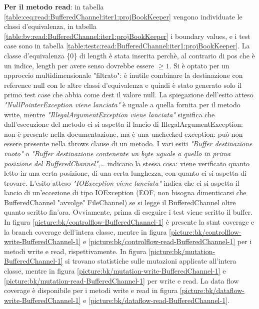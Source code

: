 \documentclass[10pt, a4paper]{article}
\newcommand{\gettablelabel}[5]{table:#1:#2:#3:iter#4:proj#5}
\newcommand{\getpicturelabel}[1]{picture:#1}
\def\bookkeeper{BookKeeper}
\newcommand{\ceq}[1]{\{#1\}}
\begin{document}
	\textbf{Per il metodo read}: in tabella \ref{\gettablelabel{ceq}{read}{BufferedChannel}{1}{\bookkeeper}}
	vengono individuate le classi d'equivalenza, in tabella 
	\ref{\gettablelabel{bv}{read}{BufferedChannel}{1}{\bookkeeper}} 
	i boundary values, e i test case sono in tabella 
	\ref{\gettablelabel{testc}{read}{BufferedChannel}{1}{\bookkeeper}}.
	La classe d'equivalenza \ceq{0} di length è stata inserita perchè, al contrario di pos che è un indice, 
	length per avere senso dovrebbe essere $\ge 1$.
	Si è optato per un approccio multidimensionale "filtrato": è inutile combinare la destinazione con reference
	null con le altre classi d'equivalenza e quindi è stato generato solo il primo test case che abbia come
	dest il valore null.
	La spiegazione dell'esito atteso \textit{"NullPointerException viene lanciata"} è uguale a quella fornita
	per il metodo write, mentre \textit{"IllegalArgumentException viene lanciata"} significa che dall'esecuzione
	del metodo ci si aspetta il lancio di IllegalArgumentException: non è presente nella documentazione, ma è
	una unchecked exception: può non essere presente nella throws clause di un metodo.
	I vari esiti \textit{"Buffer destinazione vuoto"} o 
	\textit{"Buffer destinazione contenente un byte uguale a quello in prima posizione del BufferedChannel"},\dots
	indicano la stessa cosa: 
	viene verificato quanto letto in una certa posizione, di una certa lunghezza, 
	con quanto ci si aspetta di trovare. 
	L'esito atteso \textit{"IOException viene lanciata"} indica che ci si aspetta il lancio di un'eccezione di tipo 
	IOException (EOF, non bisogna dimenticarsi che BufferedChannel "avvolge" FileChannel) 
	se si legge il BufferedChannel oltre quanto scritto fin'ora. 
	Ovviamente, prima di eseguire i test viene scritto il buffer.
	In figura \ref{\getpicturelabel{bk/controlflow-BufferedChannel-1}} è presente la stmt coverage e la branch
	coverage dell'intera classe, mentre in figura \ref{\getpicturelabel{bk/controlflow-write-BufferedChannel-1}} e 
	\ref{\getpicturelabel{bk/controlflow-read-BufferedChannel-1}} per i metodi write e read, rispettivamente.
	In figura \ref{\getpicturelabel{bk/mutation-BufferedChannel-1}} si trovano statistiche sulle mutazioni
	applicate all'intera classe, mentre in figura \ref{\getpicturelabel{bk/mutation-write-BufferedChannel-1}} e 
	\ref{\getpicturelabel{bk/mutation-read-BufferedChannel-1}} per write e read.
	La data flow coverage è disponibile per i metodi write e read in figura 
	\ref{\getpicturelabel{bk/dataflow-write-BufferedChannel-1}} e 
	\ref{\getpicturelabel{bk/dataflow-read-BufferedChannel-1}}.
\end{document}
